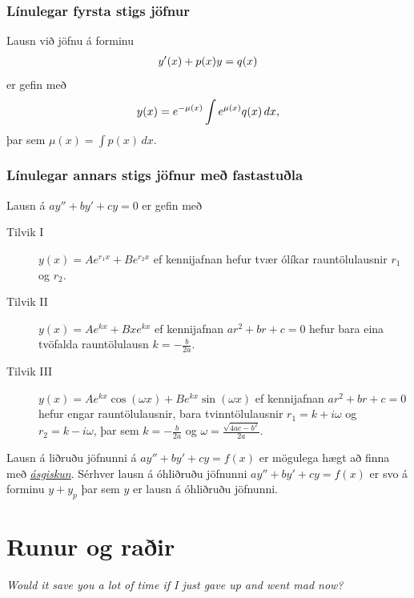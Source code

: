 \documentclass[a4paper,10pt,icelandic]{sphinxmanual}
\begin{document}
\subsection{Línulegar fyrsta stigs jöfnur}
\label{kafli08:linulegar-fyrsta-stigs-jofnur}
Lausn við jöfnu á forminu
\begin{gather}
\begin{split}y'(x) + p(x)y = q(x)\end{split}\notag
\end{gather}
er gefin með
\begin{gather}
\begin{split}y(x) = e^{-\mu(x)} \int e^{\mu(x)} q(x)\, dx,\end{split}\notag
\end{gather}
þar sem \(\mu(x) = \int p(x)\, dx\).


\subsection{Línulegar annars stigs jöfnur með fastastuðla}
\label{kafli08:linulegar-annars-stigs-jofnur-me-fastastula}
Lausn á \(ay''+by'+cy=0\) er gefin með
\begin{description}
\item[{Tilvik I}] \leavevmode
\(y(x)=Ae^{r_1x}+Be^{r_2x}\)
ef kennijafnan hefur tvær ólíkar rauntölulausnir \(r_1\) og
\(r_2\).

\item[{Tilvik II}] \leavevmode
\(y(x)=Ae^{kx}+Bxe^{kx}\)
ef kennijafnan \(ar^2+br+c=0\) hefur bara eina tvöfalda rauntölulausn
\(k=-\frac{b}{2a}\).

\item[{Tilvik III}] \leavevmode
\(y(x)=Ae^{kx}\cos(\omega x)+Be^{kx}\sin(\omega x)\)
ef kennijafnan \(ar^2+br+c=0\) hefur engar rauntölulausnir,
bara tvinntölulausnir \(r_1=k+i\omega\) og
\(r_2=k-i\omega\), þar sem
\(k=-\frac{b}{2a}\) og \(\omega=\frac{\sqrt{4ac-b^2}}{2a}\).

\end{description}

Lausn á liðruðu jöfnunni  á \(ay''+by'+cy=f(x)\) er mögulega hægt að finna
með {\hyperref[kafli08:agiskun]{\emph{ásgiskun}}}. Sérhver lausn á óhliðruðu jöfnunni \(ay''+by'+cy=f(x)\)
er svo á forminu \(y+y_p\) þar sem \(y\) er
lausn á óhliðruðu jöfnunni.


\chapter{Runur og raðir}
\label{kafli09::doc}\label{kafli09:runur-og-rair}
\emph{Would it save you a lot of time if I just gave up and went mad now?}
\end{document}
